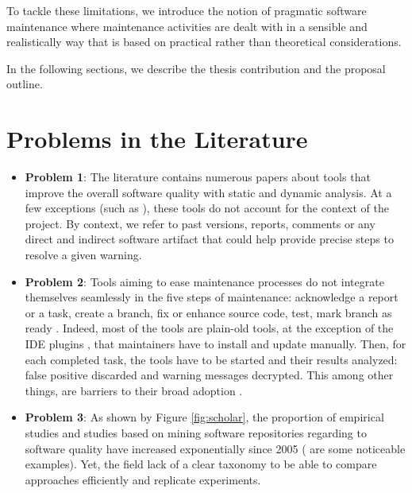 To tackle these limitations, we introduce the notion of pragmatic software maintenance where maintenance activities are dealt with in a sensible and realistically way that is based on practical rather than theoretical considerations.

In the following sections, we describe the thesis contribution and the proposal outline.

\section{Problems in the Literature\label{sec:pb-litterature}}

\begin{itemize}

		\item {\bf Problem 1}: The literature contains numerous papers about tools that improve the overall software quality with static \cite{Dangel2000, burn2003checkstyle, Hovemeyer2007, Moha2010} and dynamic \cite{Nayrolles,Nayrolles2013a,Palma2013} analysis.
		At a few exceptions (such as \cite{Lopez2011, Montandon2013}), these tools do not account for the context of the project.
		By context, we refer to past versions, reports, comments or any direct and indirect software artifact that could help provide precise steps to resolve a given warning.

		\item {\bf Problem 2}: Tools aiming to ease maintenance processes do not integrate themselves seamlessly in the  five steps of maintenance: acknowledge a report or a task, create a branch, fix or enhance source code, test, mark branch as ready	\cite{Kamiya2002a, Nayrolles, Nayrolles2013a, Jeffrey2009, Chen2013, Gavrilov2013, Jin2012, Nessa2008, Dallmeier, Nayrolles2015a, demange2013, Jiang2007, Iss2009}.
		Indeed, most of the tools are plain-old tools, at the exception of the IDE plugins \cite{Kamiya2002a, Hovemeyer2007}, that maintainers have to install and update manually.
		Then, for each completed task, the tools have to be started and their results analyzed: false positive discarded and warning messages decrypted.
		This among other things, are barriers to their broad adoption \cite{Johnson2013,Lewis2013}.

		\item {\bf Problem 3}: As shown by Figure \ref{fig:scholar}, the proportion of empirical studies and studies based on mining software repositories regarding to software quality have increased exponentially since 2005 (\cite{Kim2011a,Lee2011a,Sun2011,Bhattacharya2011,Tian2012a,Zimmermann2012, Shang2013, Chen2014, McIntosh, Hemmati2015} are some noticeable examples).
		Yet, the field lack of a clear taxonomy to be able to compare approaches efficiently and replicate experiments\cite{Hassan2008,Godfrey2009}.


\end{itemize}
